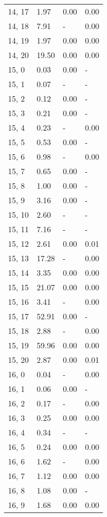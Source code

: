 \begin{table}
\begin{tabular}{llll}
14, 17 &    1.97 &  0.00 &  0.00 \\
14, 18 &    7.91 &     - &  0.00 \\
14, 19 &    1.97 &  0.00 &  0.00 \\
14, 20 &   19.50 &  0.00 &  0.00 \\
15, 0  &    0.03 &  0.00 &     - \\
15, 1  &    0.07 &     - &     - \\
15, 2  &    0.12 &  0.00 &     - \\
15, 3  &    0.21 &  0.00 &     - \\
15, 4  &    0.23 &     - &  0.00 \\
15, 5  &    0.53 &  0.00 &     - \\
15, 6  &    0.98 &     - &  0.00 \\
15, 7  &    0.65 &  0.00 &     - \\
15, 8  &    1.00 &  0.00 &     - \\
15, 9  &    3.16 &  0.00 &     - \\
15, 10 &    2.60 &     - &     - \\
15, 11 &    7.16 &     - &     - \\
15, 12 &    2.61 &  0.00 &  0.01 \\
15, 13 &   17.28 &     - &  0.00 \\
15, 14 &    3.35 &  0.00 &  0.00 \\
15, 15 &   21.07 &  0.00 &  0.00 \\
15, 16 &    3.41 &     - &  0.00 \\
15, 17 &   52.91 &  0.00 &     - \\
15, 18 &    2.88 &     - &  0.00 \\
15, 19 &   59.96 &  0.00 &  0.00 \\
15, 20 &    2.87 &  0.00 &  0.01 \\
16, 0  &    0.04 &     - &  0.00 \\
16, 1  &    0.06 &  0.00 &     - \\
16, 2  &    0.17 &     - &  0.00 \\
16, 3  &    0.25 &  0.00 &  0.00 \\
16, 4  &    0.34 &     - &     - \\
16, 5  &    0.24 &  0.00 &  0.00 \\
16, 6  &    1.62 &     - &  0.00 \\
16, 7  &    1.12 &  0.00 &  0.00 \\
16, 8  &    1.08 &  0.00 &     - \\
16, 9  &    1.68 &  0.00 &  0.00 \\

\end{tabular}
\end{table}
